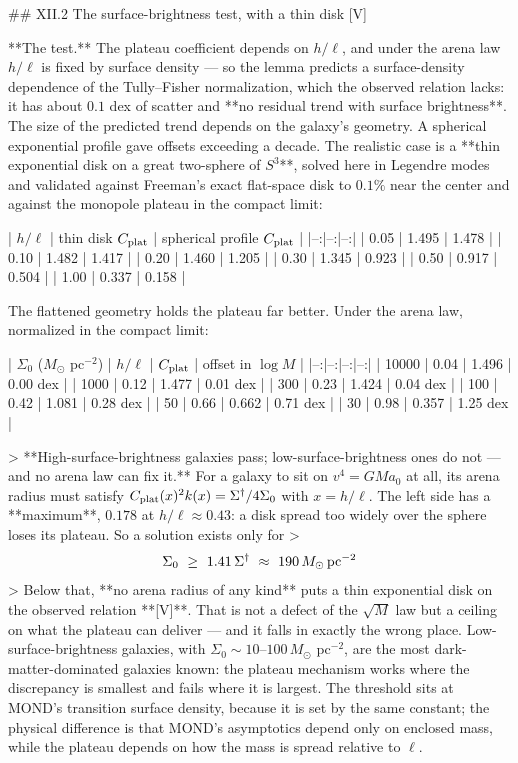 ## XII.2 The surface-brightness test, with a thin disk [V]

**The test.** The plateau coefficient depends on $h/\ell$, and under the arena law $h/\ell$ is fixed by surface density — so the lemma predicts a surface-density dependence of the Tully–Fisher normalization, which the observed relation lacks: it has about $0.1$ dex of scatter and **no residual trend with surface brightness**. The size of the predicted trend depends on the galaxy's geometry. A spherical exponential profile gave offsets exceeding a decade. The realistic case is a **thin exponential disk on a great two-sphere of $S^3$**, solved here in Legendre modes and validated against Freeman's exact flat-space disk to $0.1\%$ near the center and against the monopole plateau in the compact limit:

| $h/\ell$ | thin disk $C_{\rm plat}$ | spherical profile $C_{\rm plat}$ |
|--:|--:|--:|
| 0.05 | 1.495 | 1.478 |
| 0.10 | 1.482 | 1.417 |
| 0.20 | 1.460 | 1.205 |
| 0.30 | 1.345 | 0.923 |
| 0.50 | 0.917 | 0.504 |
| 1.00 | 0.337 | 0.158 |

The flattened geometry holds the plateau far better. Under the arena law, normalized in the compact limit:

| $\Sigma_0$ ($M_\odot$ pc$^{-2}$) | $h/\ell$ | $C_{\rm plat}$ | offset in $\log M$ |
|--:|--:|--:|--:|
| 10000 | 0.04 | 1.496 | 0.00 dex |
| 1000 | 0.12 | 1.477 | 0.01 dex |
| 300 | 0.23 | 1.424 | 0.04 dex |
| 100 | 0.42 | 1.081 | 0.28 dex |
| 50 | 0.66 | 0.662 | 0.71 dex |
| 30 | 0.98 | 0.357 | 1.25 dex |

> **High-surface-brightness galaxies pass; low-surface-brightness ones do not — and no arena law can fix it.** For a galaxy to sit on $v^4 = GMa_0$ at all, its arena radius must satisfy $C_{\rm plat}(x)^2k(x) = \Sigma^\dagger/4\Sigma_0$ with $x = h/\ell$. The left side has a **maximum**, $0.178$ at $h/\ell\approx0.43$: a disk spread too widely over the sphere loses its plateau. So a solution exists only for
> $$\Sigma_0\ \geq\ 1.41\,\Sigma^\dagger\ \approx\ 190\,M_\odot\,{\rm pc}^{-2}$$
> Below that, **no arena radius of any kind** puts a thin exponential disk on the observed relation **[V]**. That is not a defect of the $\sqrt M$ law but a ceiling on what the plateau can deliver — and it falls in exactly the wrong place. Low-surface-brightness galaxies, with $\Sigma_0\sim10$–$100\,M_\odot$ pc$^{-2}$, are the most dark-matter-dominated galaxies known: the plateau mechanism works where the discrepancy is smallest and fails where it is largest. The threshold sits at MOND's transition surface density, because it is set by the same constant; the physical difference is that MOND's asymptotics depend only on enclosed mass, while the plateau depends on how the mass is spread relative to $\ell$.

